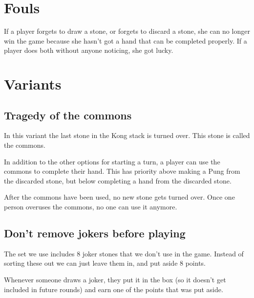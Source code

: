 \documentclass{article}
\begin{document}
\section{Fouls}
If a player forgets to draw a stone, or forgets to discard a stone, she can no longer win the game because she hasn't got a hand that can be completed properly.
If a player does both without anyone noticing, she got lucky.

\section{Variants}
\subsection{Tragedy of the commons}
In this variant the last stone in the Kong stack is turned over. This stone is called the commons.

In addition to the other options for starting a turn, a player can use the commons to complete their hand.
This has priority above making a Pung from the discarded stone, but below completing a hand from the discarded stone.

After the commons have been used, no new stone gets turned over.
Once one person overuses the commons, no one can use it anymore.

\subsection{Don't remove jokers before playing}
The set we use includes 8 joker stones that we don't use in the game. Instead of sorting these out we can just leave them in, and put aside 8 points.

Whenever someone draws a joker, they put it in the box (so it doesn't get included in future rounds) and earn one of the points that was put aside.

\end{document}
